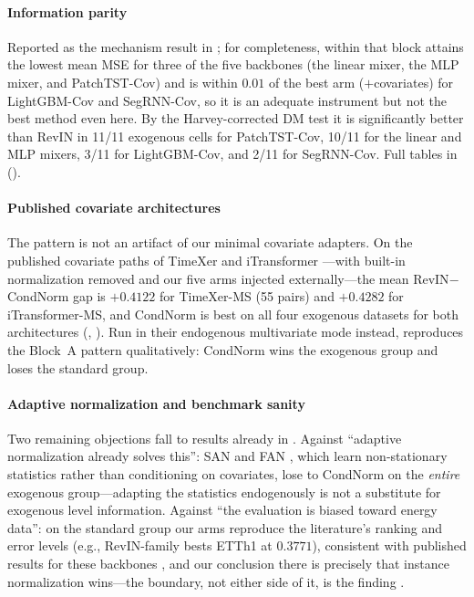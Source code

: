 \paragraph{Information parity} Reported as the mechanism result in ; for completeness, within that block \cnm{} attains the lowest mean MSE for three of the five backbones (the linear mixer, the MLP mixer, and PatchTST-Cov) and is within $0.01$ of the best arm (\rawm$+$covariates) for LightGBM-Cov and SegRNN-Cov, so it is an adequate instrument but not the best method even here. By the Harvey-corrected DM test it is significantly better than RevIN in 11/11 exogenous cells for PatchTST-Cov, 10/11 for the linear and MLP mixers, 3/11 for LightGBM-Cov, and 2/11 for SegRNN-Cov. Full tables in  ().

\paragraph{Published covariate architectures} The pattern is not an artifact of our minimal covariate adapters. On the published covariate paths of TimeXer and iTransformer \citep{wang2024timexer,liu2024itransformer}---with built-in normalization removed and our five arms injected externally---the mean RevIN$-$CondNorm gap is $+0.4122$ for TimeXer-MS (55 pairs) and $+0.4282$ for iTransformer-MS, and CondNorm is best on all four exogenous datasets for both architectures (, ). Run in their endogenous multivariate mode instead, reproduces the Block~A pattern qualitatively: CondNorm wins the exogenous group and loses the standard group.

\paragraph{Adaptive normalization and benchmark sanity} Two remaining objections fall to results already in . Against ``adaptive normalization already solves this'': SAN and FAN \citep{liu2023san,ye2024fan}, which learn non-stationary statistics rather than conditioning on covariates, lose to CondNorm on the \emph{entire} exogenous group---adapting the statistics endogenously is not a substitute for exogenous level information. Against ``the evaluation is biased toward energy data'': on the standard group our arms reproduce the literature's ranking and error levels (e.g., RevIN-family bests ETTh1 at $0.3771$), consistent with published results for these backbones \citep{li2023rlinear,qiu2024tfb}, and our conclusion there is precisely that instance normalization wins---the boundary, not either side of it, is the finding \citep{brigato2026champions}.

